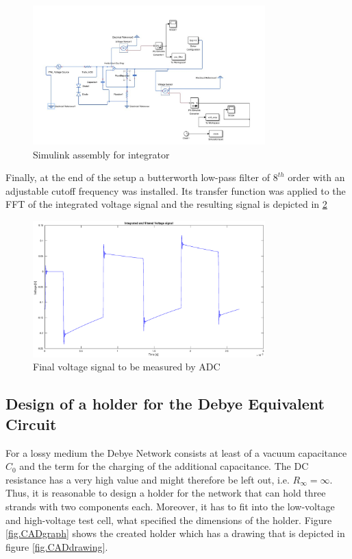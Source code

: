 \begin{figure}[h!tb]
\centerline{\includegraphics[width=0.8\textwidth]{figures/Method/signal_simulation/simulink.eps}}
\caption{Simulink assembly for integrator}
\label{fig.simulink}
\end{figure}

Finally, at the end of the setup a butterworth low-pass filter of $8^{th}$ order with an adjustable cutoff frequency
was installed. Its transfer function was applied to the FFT of the integrated voltage signal and the resulting 
signal is depicted in \ref{fig.finalvolt}


\begin{figure}[h!tb]
\centerline{\includegraphics[width=0.8\textwidth]{figures/Method/signal_simulation/finalvolt.eps}}
\caption{Final voltage signal to be measured by ADC}
\label{fig.finalvolt}
\end{figure}


\subsection{Design of a holder for the Debye Equivalent Circuit}
For a lossy medium the Debye Network consists at least of a vacuum capacitance $C_0$ and the term for the charging of the additional capacitance. The DC resistance has a very high value and might therefore be left out, i.e. $R_{\infty}={\infty}$. Thus, it is reasonable to design a holder for the network that can hold three strands with two components each. Moreover, it has to fit into the low-voltage and high-voltage test cell, what specified the dimensions of the holder.  
Figure \ref{fig.CADgraph} shows the created holder which has a drawing that is depicted in figure \ref{fig.CADdrawing}.


